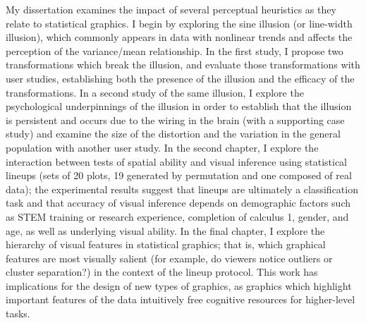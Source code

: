\documentclass[11pt,letterpaper,sans,unicode]{moderncv}        %
\begin{document}
\vspace{.65cm}\hspace{8pt}My dissertation examines the impact of several perceptual heuristics as they relate to statistical graphics. I begin by exploring the sine illusion (or line-width illusion), which commonly appears in data with nonlinear trends and affects the perception of the variance/mean relationship. In the first study, I propose two transformations which break the illusion, and evaluate those transformations with user studies, establishing both the presence of the illusion and the efficacy of the transformations. In a second study of the same illusion, I explore the psychological underpinnings of the illusion in order to establish that the illusion is persistent and occurs due to the wiring in the brain (with a supporting case study) and examine the size of the distortion and the variation in the general population with another user study. In the second chapter, I explore the interaction between tests of spatial ability and visual inference using statistical lineups (sets of 20 plots, 19 generated by permutation and one composed of real data); the experimental results suggest that lineups are ultimately a classification task and that accuracy of visual inference depends on demographic factors such as STEM training or research experience, completion of calculus 1, gender, and age, as well as underlying visual ability. In the final chapter, I explore the hierarchy of visual features in statistical graphics; that is, which graphical features are most visually salient (for example, do viewers notice outliers or cluster separation?) in the context of the lineup protocol. This work has implications for the design of new types of graphics, as graphics which highlight important features of the data intuitively free cognitive resources for higher-level tasks. 
\end{document}
